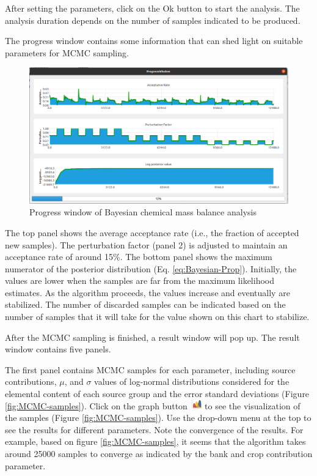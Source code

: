 \documentclass[12pt]{report}
\begin{document}
After setting the parameters, click on the Ok button to start the analysis. The analysis duration depends on the number of samples indicated to be produced. 

The progress window contains some information that can shed light on suitable parameters for MCMC sampling. 

\begin{figure}[ht]
    \centering
    \includegraphics[width=14cm]{Figures/MCMC_progress.png}
    \caption{Progress window of Bayesian chemical mass balance analysis}
    \label{fig:MCMC-progress}
\end{figure}
\FloatBarrier

The top panel shows the average acceptance rate (i.e., the fraction of accepted new samples). The perturbation factor (panel 2) is adjusted to maintain an acceptance rate of around 15\%. The bottom panel shows the maximum numerator of the posterior distribution (Eq. \eqref{eq:Bayesian-Prop}). Initially, the values are lower when the samples are far from the maximum likelihood estimates. As the algorithm proceeds, the values increase and eventually are stabilized. The number of discarded samples can be indicated based on the number of samples that it will take for the value shown on this chart to stabilize. 

After the MCMC sampling is finished, a result window will pop up. The result window contains five panels. 

The first panel contains MCMC samples for each parameter, including source contributions, $\mu$, and $\sigma$ values of log-normal distributions considered for the elemental content of each source group and the error standard deviations (Figure \ref{fig:MCMC-samples}). Click on the graph button \includegraphics[width=0.5cm]{Figures/Graph.png} to see the visualization of the samples (Figure \ref{fig:MCMC-samples}). Use the drop-down menu at the top to see the results for different parameters. Note the convergence of the results. For example, based on figure \ref{fig:MCMC-samples}, it seems that the algorithm takes around 25000 samples to converge as indicated by the bank and crop contribution parameter. 
\end{document}
